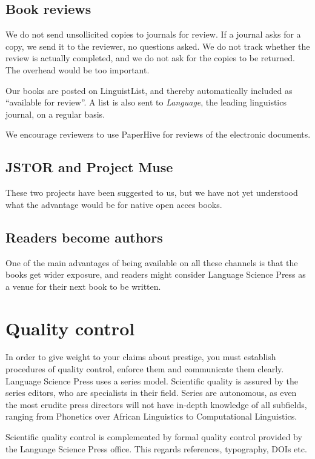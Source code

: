 \documentclass[nonflat,modfonts,output=book] {langsci/langscibook}
\begin{document}
\subsection{Book reviews}
We do not send unsollicited copies to journals for review. If a journal asks for a copy, we send it to the reviewer, no questions asked. We do not track whether the review is actually completed, and we do not ask for the copies to be returned. The overhead would be too important. 

Our books are posted on LinguistList, and thereby automatically included as ``available for review''. A list is also sent to \textit{Language}, the leading linguistics journal, on a regular basis. 

We encourage reviewers to use PaperHive for reviews of the electronic documents.

                      
\subsection{JSTOR and Project Muse}                      
These two projects have been suggested to us, but we have not yet understood what the advantage would be for native open acces books.


\subsection{Readers become authors}
One of the main advantages of being available on all these channels is that the books get wider exposure, and readers might consider Language Science Press as a venue for their next book to be written.  

\section{Quality control}\label{sec:qualitycontrol}
In order to give weight to your claims about prestige, you must establish procedures of quality control, enforce them and communicate them clearly. Language Science Press uses a series model. Scientific quality is assured by the series editors, who are specialists in their field. Series are autonomous, as even the most erudite press directors will not have in-depth knowledge of all subfields, ranging from Phonetics over African Linguistics to Computational Linguistics. 

Scientific quality control is complemented by formal quality control provided by the Language Science Press office. This regards references, typography, DOIs etc. 
\end{document}
